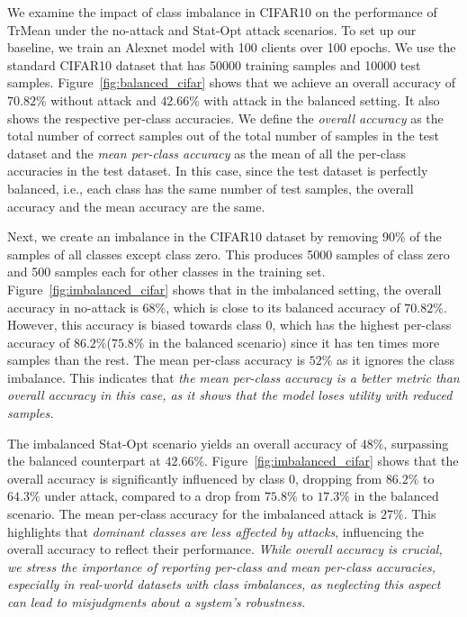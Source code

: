 We examine the impact of class imbalance in CIFAR10 on the performance of TrMean under the no-attack and Stat-Opt attack scenarios. To set up our baseline, we train an Alexnet model with 100 clients over 100 epochs. We use the standard CIFAR10 dataset that has 50000 training samples and 10000 test samples.
Figure~\ref{fig:balanced_cifar} shows that we achieve an overall accuracy of $70.82\%$ without attack and $42.66\%$ with attack in the balanced setting. It also shows the respective per-class accuracies. We define the \emph{overall accuracy} as the total number of correct samples out of the total number of samples in the test dataset and the \emph{mean per-class accuracy} as the mean of all the per-class accuracies in the test dataset. In this case, since the test dataset is perfectly balanced, i.e., each class has the same number of test samples, the overall accuracy and the mean accuracy are the same.


Next, we create an imbalance in the CIFAR10 dataset by removing $90\%$ of the samples of all classes except class zero. This produces 5000 samples of class zero and 500 samples each for other classes in the training set.
Figure~\ref{fig:imbalanced_cifar} shows that in the imbalanced setting, the overall accuracy in no-attack is $68\%$, which is close to its balanced accuracy of $70.82\%$. However, this accuracy is biased towards class 0, which has the highest per-class accuracy of $86.2\%$($75.8\%$ in the balanced scenario) since it has ten times more samples than the rest. The mean per-class accuracy is $52\%$ as it ignores the class imbalance. This indicates that \emph{the mean per-class accuracy is a better metric than overall accuracy in this case, as it shows that the model loses utility with reduced samples.}

The imbalanced Stat-Opt scenario yields an overall accuracy of $48\%$, surpassing the balanced counterpart at $42.66\%$. Figure~\ref{fig:imbalanced_cifar} shows that the overall accuracy is significantly influenced by class 0, dropping from $86.2\%$ to $64.3\%$ under attack, compared to a drop from $75.8\%$ to $17.3\%$ in the balanced scenario. The mean per-class accuracy for the imbalanced attack is $27\%$. This highlights that \emph{dominant classes are less affected by attacks}, influencing the overall accuracy to reflect their performance. \emph{While overall accuracy is crucial, we stress the importance of reporting per-class and mean per-class accuracies, especially in real-world datasets with class imbalances, as neglecting this aspect can lead to misjudgments about a system's robustness.}